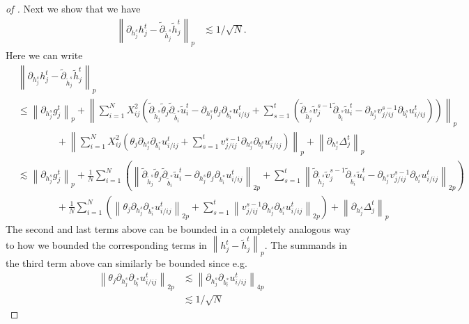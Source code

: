 \documentclass[10pt,a4paper]{amsart}
\newcommand{\norm}[1]{\left\lVert#1\right\rVert}
\begin{document}
\begin{proof}[of ]
    Next we show that we have 
    \begin{align*}
        \norm{\partial_{ h_j^s} h_j^t - \tilde{\partial}_{\tilde{ h}_j^s}\tilde{ h}_j^t}_p &\lesssim 1/\sqrt{N}.
    \end{align*}
    Here we can write 
    \begin{align}
        &\norm{\partial_{ h_j^s} h_j^t - \tilde{\partial}_{\tilde{ h}_j^s}\tilde{ h}_j^t}_p \nonumber\\
        &\leq \norm{\partial_{ h_j^s} g_j^t}_p + \norm{\sum_{i=1}^N X_{ij}^2\left(\tilde{\partial}_{\tilde{ h}_j^s}\tilde{\theta}_j \tilde{\partial}_{\tilde{b}_i^*} \tilde{u}_i^t - \partial_{ h_j^s}\theta_j \partial_{b_i^*}u_{i/ij}^t + \sum_{s=1}^t (\tilde{\partial}_{\tilde{ h}_j^s}\tilde{v}_j^{s-1} \tilde{\partial}_{\tilde{b}_i^s} \tilde{u}_i^t - \partial_{ h_j^s}v_{j/ij}^{s-1} \partial_{b_i^s}u_{i/ij}^t )\right)}_p \nonumber\\
        &\qquad \qquad + \norm{\sum_{i=1}^N X_{ij}^2\left( \theta_j \partial_{ h_j^s}\partial_{b_i^*}u_{i/ij}^t + \sum_{s=1}^t v_{j/ij}^{s-1} \partial_{ h_j^s}\partial_{b_i^s}u_{i/ij}^t \right)}_p + \norm{\partial_{ h_j^s} \Delta_j^t}_p \nonumber\\
        &\lesssim \norm{\partial_{ h_j^s} g_j^t}_p + \frac{1}{N}\sum_{i=1}^N \left(\norm{\tilde{\partial}_{\tilde{ h}_j^s}\tilde{\theta}_j \tilde{\partial}_{\tilde{b}_i^*} \tilde{u}_i^t - \partial_{ h_j^s}\theta_j \partial_{b_i^*}u_{i/ij}^t}_{2p} + \sum_{s=1}^t \norm{\tilde{\partial}_{\tilde{ h}_j^s}\tilde{v}_j^{s-1} \tilde{\partial}_{\tilde{b}_i^s} \tilde{u}_i^t - \partial_{ h_j^s}v_{j/ij}^{s-1} \partial_{b_i^s}u_{i/ij}^t }_{2p} \right) \nonumber\\
        &\qquad \qquad + \frac{1}{N}\sum_{i=1}^N\left(\norm{ \theta_j \partial_{ h_j^s}\partial_{b_i^*}u_{i/ij}^t}_{2p} + \sum_{s=1}^t\norm{ v_{j/ij}^{s-1} \partial_{ h_j^s}\partial_{b_i^s}u_{i/ij}^t }_{2p} \right)+ \norm{\partial_{ h_j^s} \Delta_j^t}_p \label{eq:h-partials-difference} 
    \end{align}
    The second and last terms above can be bounded in a completely analogous way to how we bounded the corresponding terms in $\norm{h_j^t - \tilde{h}_j^t}_p$. The summands in the third term above can similarly be bounded since e.g.
    \begin{align*}
        \norm{ \theta_j \partial_{ h_j^s}\partial_{b_i^*}u_{i/ij}^t}_{2p} &\lesssim \norm{  \partial_{ h_j^s}\partial_{b_i^*}u_{i/ij}^t}_{4p}\\
        &\lesssim 1/\sqrt{N}
    \end{align*}

\end{proof}
\end{document}
